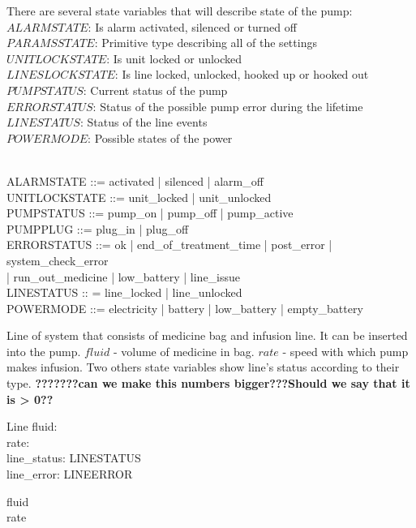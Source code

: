 \documentclass{article}
\begin{document}
	
	There are several state variables that will describe state of the pump:\\
	
	
	$ALARMSTATE$: Is alarm activated, silenced or turned off\\
	$PARAMSSTATE$: Primitive type describing all of the settings\\
	$UNITLOCKSTATE$: Is unit locked or unlocked \\
	$LINESLOCKSTATE$: Is line locked, unlocked, hooked up or hooked out\\
	$PUMPSTATUS$: Current status of the pump\\
	$ERRORSTATUS$: Status of the possible pump error during the lifetime\\
	$LINESTATUS$: Status of the line events\\
	$POWERMODE$: Possible states of the power
	
	\begin{zed}	
		[PARAMSSTATE] \\ %
		
		ALARMSTATE ::= activated | silenced | alarm\_off \\
		
	
		UNITLOCKSTATE ::= unit\_locked | unit\_unlocked \\
	
		PUMPSTATUS ::= pump\_on | pump\_off | pump\_active \\
		
		PUMPPLUG ::=  plug\_in | plug\_off\\
		
		ERRORSTATUS ::= ok | end\_of\_treatment\_time | post\_error | system\_check\_error \\ | run\_out\_medicine | low\_battery | line\_issue \\
		
		LINESTATUS :: = line\_locked | line\_unlocked \\
		
		POWERMODE ::= electricity | battery | low\_battery | empty\_battery \\
	\end{zed}
	
	
	Line of system that consists of medicine bag and infusion line. It can be inserted into the pump. $fluid$ - volume of medicine in bag. $rate$ - speed with which pump makes infusion. Two others state variables show line's status according to their type.
		\textbf{???????can we make this numbers bigger???Should we say that it is > 0??}\\
	\begin{schema}{Line}
		fluid: \nat \\
		rate: \nat \\
		line\_status: LINESTATUS \\
		line\_error: LINEERROR
	\where

	
		fluid  \\ 
		rate 
	\end{schema}
	
\end{document}
